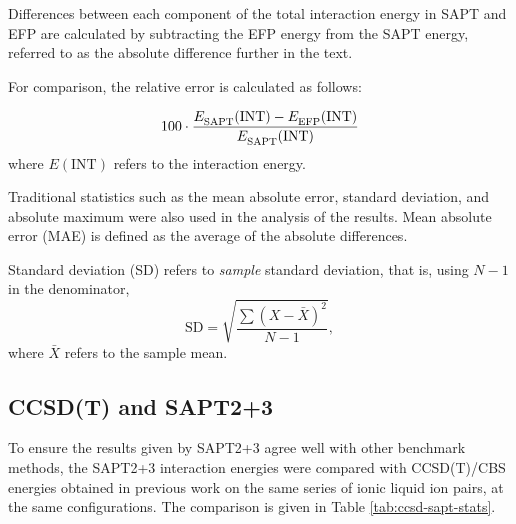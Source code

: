 

Differences between each component of the total interaction energy in SAPT and EFP are calculated by subtracting the EFP energy from the SAPT energy, referred to as the absolute difference further in the text.


For comparison, the relative error is calculated as follows: 

\begin{equation}
    100 \cdot \frac{  E^{\text{}}_{\text{SAPT}} (\text{INT}) -  E^{\text{}}_{\text{EFP}} (\text{INT}) } {  E^{\text{}}_{\text{SAPT}} (\text{INT})} 
\end{equation}
where $E(\text{INT})$ refers to the interaction energy.

Traditional statistics such as the mean absolute error, standard deviation, and absolute maximum were also used in the analysis of the results. 
Mean absolute error (MAE) is defined as the average of the absolute differences.


Standard deviation (SD) refers to \emph{sample} standard deviation, that is, using $N-1$ in the denominator,
\begin{equation}
    \text{SD} = \sqrt{\frac{\sum (X - \bar{X})^2}{N-1}} ,
\end{equation}
where $\bar{X} $ refers to the sample mean.



\subsection{CCSD(T) and SAPT2+3}
\label{subsec:ccsd}
To ensure the results given by SAPT2+3 agree well with other benchmark methods, the SAPT2+3 interaction energies were compared with CCSD(T)/CBS energies obtained in previous work 
\cite{Rigby2014a}
on the same series of ionic liquid ion pairs, at the same configurations. The comparison is given in Table \ref{tab:ccsd-sapt-stats}.


